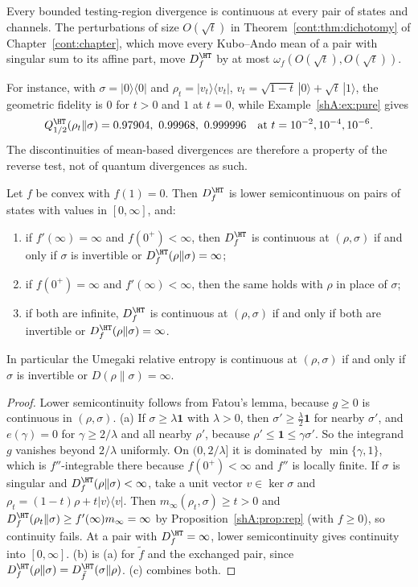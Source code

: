 \begin{corollary}[No dichotomy]\label{shA:cor:nodichotomy}
Every bounded testing-region divergence is continuous at every pair of states and channels. The perturbations of size $O(\sqrt t)$ in Theorem~\ref{cont:thm:dichotomy} of Chapter~\ref{cont:chapter}, which move every Kubo--Ando mean of a pair with singular sum to its affine part, move $D^\HT_f$ by at most $\omega_f(O(\sqrt t),O(\sqrt t))$.
\end{corollary}

For instance, with $\sigma=|0\rangle\langle0|$ and $\rho_t=|v_t\rangle\langle v_t|$, $v_t=\sqrt{1-t}\,|0\rangle+\sqrt t\,|1\rangle$, the geometric fidelity is $0$ for $t>0$ and $1$ at $t=0$, while Example~\ref{shA:ex:pure} gives
\[
Q^\HT_{1/2}(\rho_t\|\sigma)=0.97904,\ 0.99968,\ 0.999996\quad\text{at }t=10^{-2},10^{-4},10^{-6}.
\]
The discontinuities of mean-based divergences are therefore a property of the reverse test, not of quantum divergences as such.

\begin{theorem}\label{shA:thm:unbounded}
Let $f$ be convex with $f(1)=0$. Then $D^\HT_f$ is lower semicontinuous on pairs of states with values in $[0,\infty]$, and:
\begin{enumerate}[label=(\alph*)]
\item if $f'(\infty)=\infty$ and $f(0^+)<\infty$, then $D^\HT_f$ is continuous at $(\rho,\sigma)$ if and only if $\sigma$ is invertible or $D^\HT_f(\rho\|\sigma)=\infty$;
\item if $f(0^+)=\infty$ and $f'(\infty)<\infty$, then the same holds with $\rho$ in place of $\sigma$;
\item if both are infinite, $D^\HT_f$ is continuous at $(\rho,\sigma)$ if and only if both are invertible or $D^\HT_f(\rho\|\sigma)=\infty$.
\end{enumerate}
In particular the Umegaki relative entropy is continuous at $(\rho,\sigma)$ if and only if $\sigma$ is invertible or $D(\rho\|\sigma)=\infty$.
\end{theorem}

\begin{proof}
Lower semicontinuity follows from Fatou's lemma, because $g\ge0$ is continuous in $(\rho,\sigma)$. (a) If $\sigma\ge\lambda\mathbf 1$ with $\lambda>0$, then $\sigma'\ge\frac\lambda2\mathbf 1$ for nearby $\sigma'$, and $e(\gamma)=0$ for $\gamma\ge2/\lambda$ and all nearby $\rho'$, because $\rho'\le\mathbf 1\le\gamma\sigma'$. So the integrand $g$ vanishes beyond $2/\lambda$ uniformly. On $(0,2/\lambda]$ it is dominated by $\min\{\gamma,1\}$, which is $f''$-integrable there because $f(0^+)<\infty$ and $f''$ is locally finite. If $\sigma$ is singular and $D^\HT_f(\rho\|\sigma)<\infty$, take a unit vector $v\in\ker\sigma$ and $\rho_t=(1-t)\rho+t|v\rangle\langle v|$. Then $m_\infty(\rho_t,\sigma)\ge t>0$ and $D^\HT_f(\rho_t\|\sigma)\ge f'(\infty)m_\infty=\infty$ by Proposition~\ref{shA:prop:rep} (with $f\ge0$), so continuity fails. At a pair with $D^\HT_f=\infty$, lower semicontinuity gives continuity into $[0,\infty]$. (b) is (a) for $\tilde f$ and the exchanged pair, since $D^\HT_f(\rho\|\sigma)=D^\HT_{\tilde f}(\sigma\|\rho)$. (c) combines both.
\end{proof}

